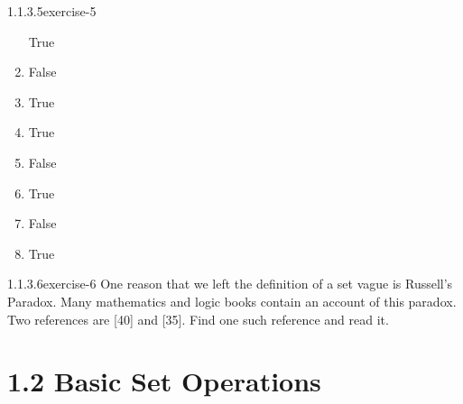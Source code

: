 \documentclass[twoside,10pt,]{book}
\numberwithin{equation}{section}
\begin{document}
\begin{divisionsolution}{1.1.3.5}{}{exercise-5}
\begin{multicols}{3}
\begin{enumerate}[label=(\alph*)]
True%
\item\hypertarget{li-184}{}\hypertarget{p-226}{}%
False%
\item\hypertarget{li-185}{}\hypertarget{p-227}{}%
True%
\item\hypertarget{li-186}{}\hypertarget{p-228}{}%
True%
\item\hypertarget{li-187}{}\hypertarget{p-229}{}%
False%
\item\hypertarget{li-188}{}\hypertarget{p-230}{}%
True%
\item\hypertarget{li-189}{}\hypertarget{p-231}{}%
False%
\item\hypertarget{li-190}{}\hypertarget{p-232}{}%
True%
\end{enumerate}
\end{multicols}
%
\end{divisionsolution}%
\begin{divisionsolution}{1.1.3.6}{}{exercise-6}%
\hypertarget{p-233}{}%
One reason that we left the definition of a set vague is Russell's Paradox. Many mathematics and logic books contain an account of this paradox. Two references are [40] and [35]. Find one such reference and read it.%
\end{divisionsolution}%
\section*{1.2 Basic Set Operations}
\end{document}

